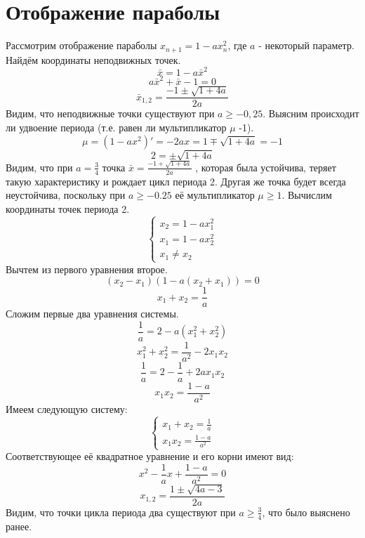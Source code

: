\documentclass[12pt, a4paper]{article}
\begin{document}
\section{Отображение параболы}
Рассмотрим отображение параболы $x_{n+1} = 1 - a x^2_{n}$, где $a$ - некоторый параметр.
\newline
Найдём координаты неподвижных точек.
\[ \bar x = 1 - a \bar x^2 \]
\[ a \bar x^2 + \bar x - 1 = 0 \]
\[ \bar x_{1,2} = \frac{-1 \pm \sqrt{1 + 4a}}{2a}\]
Видим, что неподвижные точки существуют при $ a \geq -0,25$.
Выясним происходит ли удвоение периода (т.е. равен ли мультипликатор $\mu$ -1).
\[ \mu = (1 - ax^2)' = -2ax = 1 \mp \sqrt{1 + 4a} = -1 \]
\[ 2 = \pm \sqrt{1 + 4a}\]
Видим, что при $a = \frac{3}{4}$ точка $ \bar x = \frac{-1 + \sqrt{1 + 4a}}{2a} $ , которая была устойчива, теряет такую характеристику и рождает цикл периода 2. Другая же точка будет всегда неустойчива, поскольку при $a \geq -0.25$ её мультипликатор $\mu \geq 1$.
\newline
Вычислим координаты точек периода 2.
\[ \begin{cases} 
		x_2 = 1 - ax^2_1 \\
		x_1 = 1 - ax^2_2 \\
		x_1 \neq x_2
   \end{cases}
\]
Вычтем из первого уравнения второе.
\[ (x_2 - x_1)(1 - a(x_2 + x_1)) = 0 \]
\[ x_1 + x_2 = \frac{1}{a} \]
Сложим первые два уравнения системы.
\[ \frac{1}{a} = 2 - a(x^2_1 + x^2_2) \]
\[ x^2_1 + x^2_2 = \frac{1}{a^2} - 2x_1 x_2\]
\[ \frac{1}{a} = 2 - \frac{1}{a} + 2ax_1 x_2 \]
\[ x_1 x_2 = \frac{1 - a}{a^2} \]
Имеем следующую систему:
\[
	\begin{cases}
		x_1 + x_2 = \frac{1}{a} \\
		x_1 x_2 = \frac{1 - a}{a^2}
	\end{cases}
\]
Соответствующее её квадратное уравнение и его корни имеют вид:
\[ x^2 - \frac{1}{a} x + \frac{1 - a}{a^2} = 0 \]
\[ x_{1,2} = \frac{1 \pm \sqrt{4a - 3}}{2a} \]
Видим, что точки цикла периода два существуют при $a \geq \frac{3}{4}$, что было выяснено ранее.
\end{document}
